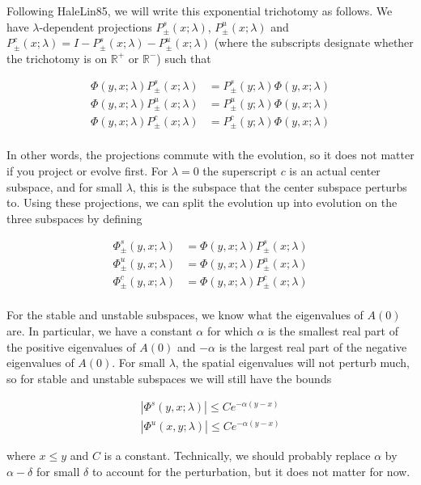 \documentclass[12pt]{article}
\def\R{{\mathbb R}}
\begin{document}
Following HaleLin85, we will write this exponential trichotomy as follows. We have $\lambda$-dependent projections $P^s_\pm(x; \lambda)$, $P^u_\pm(x; \lambda)$ and $P^c_\pm(x; \lambda) = I - P^s_\pm(x; \lambda) - P^u_\pm(x; \lambda)$ (where the subscripts designate whether the trichotomy is on $\R^+$ or $\R^-$) such that

\begin{align*}
\Phi(y, x; \lambda)P^s_\pm(x; \lambda) &= P^s_\pm(y; \lambda)\Phi(y, x; \lambda) \\
\Phi(y, x; \lambda)P^u_\pm(x; \lambda) &= P^u_\pm(y; \lambda)\Phi(y, x; \lambda) \\
\Phi(y, x; \lambda)P^c_\pm(x; \lambda) &= P^c_\pm(y; \lambda)\Phi(y, x; \lambda) \\
\end{align*}

In other words, the projections commute with the evolution, so it does not matter if you project or evolve first. For $\lambda = 0$ the superscript $c$ is an actual center subspace, and for small $\lambda$, this is the subspace that the center subspace perturbs to. Using these projections, we can split the evolution up into evolution on the three subspaces by defining

\begin{align*}
\Phi^s_\pm(y, x; \lambda) &= \Phi(y, x; \lambda)P^s_\pm(x; \lambda) \\
\Phi^u_\pm(y, x; \lambda) &= \Phi(y, x; \lambda)P^u_\pm(x; \lambda) \\
\Phi^c_\pm(y, x; \lambda) &= \Phi(y, x; \lambda)P^c_\pm(x; \lambda) \\
\end{align*}

For the stable and unstable subspaces, we know what the eigenvalues of $A(0)$ are. In particular, we have a constant $\alpha$ for which $\alpha$ is the smallest real part of the positive eigenvalues of $A(0)$ and $-\alpha$ is the largest real part of the negative eigenvalues of $A(0)$. For small $\lambda$, the spatial eigenvalues will not perturb much, so for stable and unstable subspaces we will still have the bounds

\begin{align*}
|\Phi^s(y, x; \lambda)| \leq C e^{-\alpha(y-x)} \\
|\Phi^u(x, y; \lambda)| \leq C e^{-\alpha(y-x)}
\end{align*}

where $x \leq y$ and $C$ is a constant. Technically, we should probably replace $\alpha$ by $\alpha - \delta$ for small $\delta$ to account for the perturbation, but it does not matter for now.\\
\end{document}

